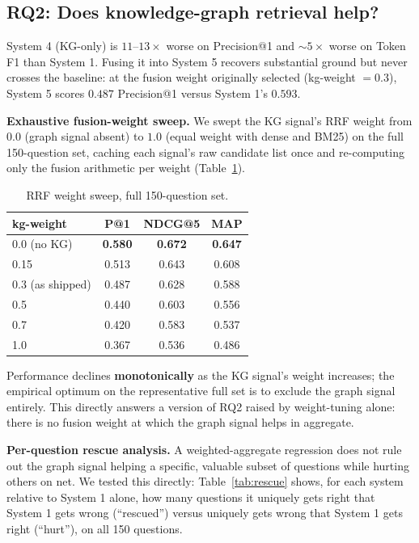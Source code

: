 \documentclass[sigconf,anonymous,review]{acmart}
\begin{document}
\subsection{RQ2: Does knowledge-graph retrieval help?}
\label{sec:kg-results}

System 4 (KG-only) is $11$--$13\times$ worse on Precision@1 and $\sim\!5\times$ worse on Token F1 than System 1. Fusing it into System 5 recovers substantial ground but never crosses the baseline: at the fusion weight originally selected (kg-weight $=0.3$), System 5 scores $0.487$ Precision@1 versus System 1's $0.593$.

\textbf{Exhaustive fusion-weight sweep.} We swept the KG signal's RRF weight from $0.0$ (graph signal absent) to $1.0$ (equal weight with dense and BM25) on the full 150-question set, caching each signal's raw candidate list once and re-computing only the fusion arithmetic per weight (Table~\ref{tab:sweep}).

\begin{table}[t]
\caption{RRF weight sweep, full 150-question set.}
\label{tab:sweep}
\begin{tabular}{lccc}
\toprule
kg-weight & P@1 & NDCG@5 & MAP \\
\midrule
0.0 (no KG)  & \textbf{0.580} & \textbf{0.672} & \textbf{0.647} \\
0.15         & 0.513 & 0.643 & 0.608 \\
0.3 (as shipped) & 0.487 & 0.628 & 0.588 \\
0.5          & 0.440 & 0.603 & 0.556 \\
0.7          & 0.420 & 0.583 & 0.537 \\
1.0          & 0.367 & 0.536 & 0.486 \\
\bottomrule
\end{tabular}
\end{table}

Performance declines \textbf{monotonically} as the KG signal's weight increases; the empirical optimum on the representative full set is to exclude the graph signal entirely. This directly answers a version of RQ2 raised by weight-tuning alone: there is no fusion weight at which the graph signal helps in aggregate.

\textbf{Per-question rescue analysis.} A weighted-aggregate regression does not rule out the graph signal helping a specific, valuable subset of questions while hurting others on net. We tested this directly: Table~\ref{tab:rescue} shows, for each system relative to System 1 alone, how many questions it uniquely gets right that System 1 gets wrong (``rescued'') versus uniquely gets wrong that System 1 gets right (``hurt''), on all 150 questions.
\end{document}
